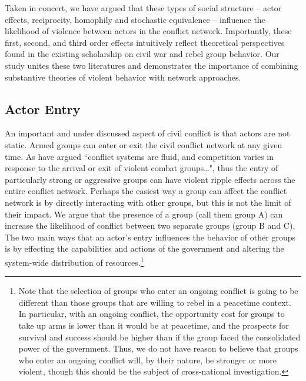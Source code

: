 Taken in concert, we have argued that these types of social structure -- actor effects, reciprocity, homophily and stochastic equivalence -- influence the likelihood of violence between actors in the conflict network. Importantly, these first, second, and third order effects intuitively reflect theoretical perspectives found in the existing scholarship on civil war and rebel group behavior.  Our study unites these two literatures and demonstrates the importance of combining substantive theories of violent behavior with network approaches. %

\subsection*{Actor Entry}

An important and under discussed aspect of civil conflict is that actors are not static. Armed groups can enter or exit the civil conflict network at any given time. As \citet[p. 168]{kathman:wood:2015} have argued ``conflict systems are fluid, and competition varies in response to the arrival or exit of violent combat groups\ldots", thus the entry of particularly strong or aggressive groups can have violent ripple effects across the entire conflict network. Perhaps the easiest way a group can affect the conflict network is by directly interacting with other groups, but this is not the limit of their impact. We argue that the presence of a group (call them group A) can increase the likelihood of conflict between two separate groups (group B and C). The two main ways that an actor's entry influences the behavior of other groups is by effecting the capabilities and actions of the government and altering the system-wide distribution of resources.\footnote{Note that the selection of groups who enter an ongoing conflict is going to be different than those groups that are willing to rebel in a peacetime context. In particular, with an ongoing conflict, the opportunity cost for groups to take up arms is lower than it would be at peacetime, and the prospects for survival and success should be higher than if the group faced the consolidated power of the government. Thus, we do not have reason to believe that groups who enter an ongoing conflict will, by their nature, be stronger or more violent, though this should be the subject of cross-national investigation.}

